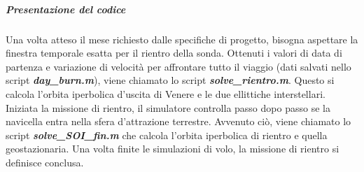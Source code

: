 \documentclass[a4paper]{article}
\begin{document}
\subparagraph{Presentazione del codice\newline}
Una volta atteso il mese richiesto dalle specifiche di progetto, bisogna aspettare la finestra temporale esatta per il rientro della sonda. \newline Ottenuti i valori di data di partenza e variazione di velocità per affrontare tutto il viaggio (dati salvati nello script \textit{\textbf{day\_burn.m}}), viene chiamato lo script \textit{\textbf{solve\_rientro.m}}. Questo si calcola l'orbita iperbolica d'uscita di Venere e le due ellittiche interstellari. Iniziata la missione di rientro, il simulatore controlla passo dopo passo se la navicella entra nella sfera d'attrazione terrestre. Avvenuto ciò, viene chiamato lo script \textit{\textbf{solve\_SOI\_fin.m}} che calcola l'orbita iperbolica di rientro e quella geostazionaria. Una volta finite le simulazioni di volo, la missione di rientro si definisce conclusa.

\newpage
\end{document}

